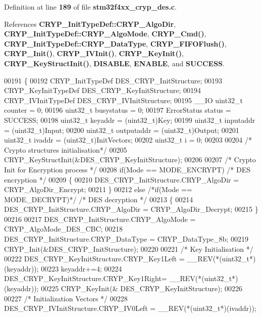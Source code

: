 Definition at line \textbf{ 189} of file \textbf{ stm32f4xx\+\_\+cryp\+\_\+des.\+c}.



References \textbf{ C\+R\+Y\+P\+\_\+\+Init\+Type\+Def\+::\+C\+R\+Y\+P\+\_\+\+Algo\+Dir}, \textbf{ C\+R\+Y\+P\+\_\+\+Init\+Type\+Def\+::\+C\+R\+Y\+P\+\_\+\+Algo\+Mode}, \textbf{ C\+R\+Y\+P\+\_\+\+Cmd()}, \textbf{ C\+R\+Y\+P\+\_\+\+Init\+Type\+Def\+::\+C\+R\+Y\+P\+\_\+\+Data\+Type}, \textbf{ C\+R\+Y\+P\+\_\+\+F\+I\+F\+O\+Flush()}, \textbf{ C\+R\+Y\+P\+\_\+\+Init()}, \textbf{ C\+R\+Y\+P\+\_\+\+I\+V\+Init()}, \textbf{ C\+R\+Y\+P\+\_\+\+Key\+Init()}, \textbf{ C\+R\+Y\+P\+\_\+\+Key\+Struct\+Init()}, \textbf{ D\+I\+S\+A\+B\+LE}, \textbf{ E\+N\+A\+B\+LE}, and \textbf{ S\+U\+C\+C\+E\+SS}.


\begin{DoxyCode}
00191 \{
00192   CRYP_InitTypeDef DES\_CRYP\_InitStructure;
00193   CRYP_KeyInitTypeDef DES\_CRYP\_KeyInitStructure;
00194   CRYP_IVInitTypeDef DES\_CRYP\_IVInitStructure;
00195   \_\_IO uint32\_t counter = 0;
00196   uint32\_t busystatus = 0;
00197   ErrorStatus status = SUCCESS;
00198   uint32\_t keyaddr    = (uint32\_t)Key;
00199   uint32\_t inputaddr  = (uint32\_t)Input;
00200   uint32\_t outputaddr = (uint32\_t)Output;
00201   uint32\_t ivaddr     = (uint32\_t)InitVectors;
00202   uint32\_t i = 0;
00203 
00204   \textcolor{comment}{/* Crypto structures initialisation*/}
00205   CRYP_KeyStructInit(&DES\_CRYP\_KeyInitStructure);
00206 
00207   \textcolor{comment}{/* Crypto Init for Encryption process */}
00208   \textcolor{keywordflow}{if}(Mode == MODE_ENCRYPT) \textcolor{comment}{/* DES encryption */}
00209   \{
00210      DES\_CRYP\_InitStructure.CRYP_AlgoDir  = CRYP_AlgoDir_Encrypt;
00211   \}
00212   \textcolor{keywordflow}{else} \textcolor{comment}{/*if(Mode == MODE\_DECRYPT)*/} \textcolor{comment}{/* DES decryption */}
00213   \{
00214      DES\_CRYP\_InitStructure.CRYP_AlgoDir  = CRYP_AlgoDir_Decrypt;
00215   \}
00216 
00217   DES\_CRYP\_InitStructure.CRYP_AlgoMode = CRYP_AlgoMode_DES_CBC;
00218   DES\_CRYP\_InitStructure.CRYP_DataType = CRYP_DataType_8b;
00219   CRYP_Init(&DES\_CRYP\_InitStructure);
00220 
00221   \textcolor{comment}{/* Key Initialisation */}
00222   DES\_CRYP\_KeyInitStructure.CRYP_Key1Left = \_\_REV(*(uint32\_t*)(keyaddr));
00223   keyaddr+=4;
00224   DES\_CRYP\_KeyInitStructure.CRYP_Key1Right= \_\_REV(*(uint32\_t*)(keyaddr));
00225   CRYP_KeyInit(& DES\_CRYP\_KeyInitStructure);
00226 
00227   \textcolor{comment}{/* Initialization Vectors */}
00228   DES\_CRYP\_IVInitStructure.CRYP_IV0Left = \_\_REV(*(uint32\_t*)(ivaddr));

\end{DoxyCode}
